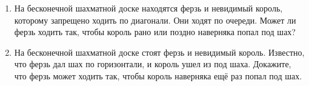 \documentclass{article}
\begin{document}
\begin{enumerate}[label*=\protect\fbox{\arabic{enumi}}]
\item На бесконечной шахматной доске находятся ферзь и невидимый король, которому запрещено ходить по диагонали. Они ходят по очереди. Может ли ферзь ходить так, чтобы король рано или поздно наверняка попал под шах?

\item На бесконечной шахматной доске стоят ферзь и невидимый король. Известно, что ферзь дал шах по горизонтали, и король ушел из под шаха. Докажите, что ферзь может ходить так, чтобы король наверняка ещё раз попал под шах.

	
\end{enumerate}
\end{document}
